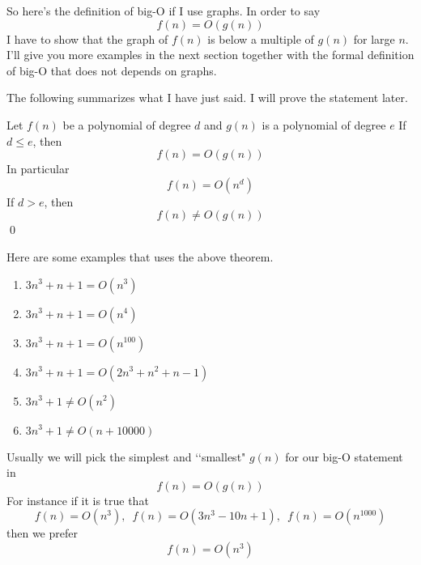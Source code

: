 So here's the definition of big-O if I use graphs.
In order to say
\[
f(n) = O(g(n))
\]
I have to show that the graph of $f(n)$ is below a multiple of $g(n)$
for large $n$.
I'll give you more examples in the next section together with
the formal definition of big-O that does not depends on graphs.

The following summarizes what I have just said.
I will prove the statement later.

\begin{thm}
Let $f(n)$ be a polynomial of degree $d$ and $g(n)$ is a polynomial
of degree $e$
If $d \leq e$, then
\[
f(n) = O(g(n))
\]
In particular
\[
f(n) = O(n^d)
\]
If $d > e$, then
\[
f(n) \neq O(g(n))
\]
\qed
\end{thm}

\begin{eg}
  Here are some examples that uses the above theorem.
  \begin{enumerate}[nosep,label=(\alph*)]
  \item $3n^3 + n + 1 = O(n^3)$
  \item $3n^3 + n + 1 = O(n^4)$  
  \item $3n^3 + n + 1 = O(n^{100})$
  \item $3n^3 + n + 1 = O(2n^3 + n^2 + n - 1)$
  \item $3n^3 + 1 \neq O(n^2)$
  \item $3n^3 + 1 \neq O(n + 10000)$
  \end{enumerate}
\end{eg}

Usually we will pick the simplest and \lq\lq smallest" $g(n)$
for our big-O statement in
\[
f(n) = O(g(n))
\]
For instance if it is true that
\[
f(n) = O(n^3), \,\,\,
f(n) = O(3n^3 - 10n + 1), \,\,\,
f(n) = O(n^{1000})
\]
then we prefer
\[
f(n) = O(n^3)
\]

\newpage
